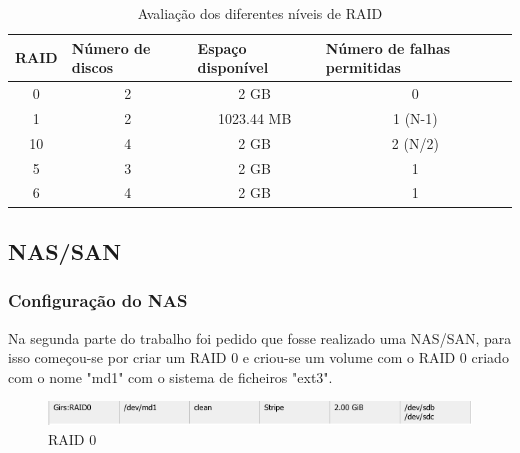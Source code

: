 \documentclass[pdftex,12pt,a4paper]{report}
\begin{document}
\begin{table}[!htb]
\centering
\caption{Avaliação dos diferentes níveis de RAID}
\label{my-label}
\begin{tabular}{|c|c|c|c|}
\hline
\multicolumn{1}{|l|}{\textbf{RAID}} & \multicolumn{1}{l|}{\textbf{Número de discos}} & \multicolumn{1}{l|}{\textbf{Espaço disponível}} & \multicolumn{1}{l|}{\textbf{Número de falhas permitidas}} \\ \hline
0                                   & 2                                              & 2 GB                                            & 0                                                        \\ \hline
1                                   & 2                                              & 1023.44 MB                                      & 1 (N-1)                                                  \\ \hline
10                                  & 4                                              & 2 GB                                            & 2 (N/2)                                                  \\ \hline
5                                   & 3                                              & 2 GB                                            & 1                                                        \\ \hline
6                                   & 4                                              & 2 GB                                            & 1                                                        \\ \hline
\end{tabular}
\end{table}

\subsection{NAS/SAN}

\subsubsection{Configuração do NAS}

Na segunda parte do trabalho foi pedido que fosse realizado uma NAS/SAN, para isso começou-se por criar um RAID 0 e criou-se um volume com o RAID 0 criado com o nome "md1" com o sistema de ficheiros "ext3". 

\begin{figure}[!htb]
\center
 \includegraphics[width=150mm,scale=1]{imagens/RAID0.png}
 \caption{RAID 0}
 \label{fig:raid0}
\end{figure}
\end{document}
